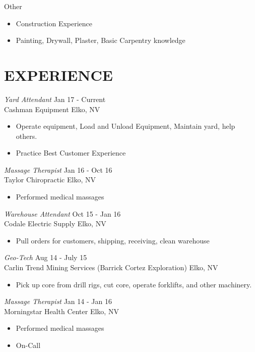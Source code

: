\documentclass[margin, 10pt]{res} %
\begin{document}
\begin{resume}
Other
\begin{itemize} \itemsep -2pt
\item Construction Experience
\item Painting, Drywall, Plaster, Basic Carpentry knowledge 
\end{itemize} 
 
 
\section{EXPERIENCE}

{\sl Yard Attendant  } \hfill Jan 17 - Current \\
Cashman Equipment Elko, NV

\begin{itemize} \itemsep -2pt %
\item Operate equipment, Load and Unload Equipment, Maintain yard, help others. 
\item Practice Best Customer Experience
\end{itemize}
 
{\sl Massage Therapist} \hfill Jan 16 - Oct 16 \\
Taylor Chiropractic Elko, NV
\begin{itemize} 
\item Performed medical massages
\end{itemize} 

{\sl Warehouse Attendant} \hfill Oct 15 - Jan 16 \\
Codale Electric Supply Elko, NV
\begin{itemize}
\item Pull orders for customers, shipping, receiving, clean warehouse 
\end{itemize} 

{\sl Geo-Tech} \hfill Aug 14 - July 15 \\
Carlin Trend Mining Services (Barrick Cortez Exploration)  Elko, NV
\begin{itemize}
\item Pick up core from drill rigs, cut core, operate forklifts, and other machinery.
\end{itemize} 

{\sl Massage Therapist} \hfill Jan 14 - Jan 16 \\
Morningstar Health Center Elko, NV
\begin{itemize} 
\item Performed medical massages
\item On-Call
\end{itemize} 


\end{resume}
\end{document}
